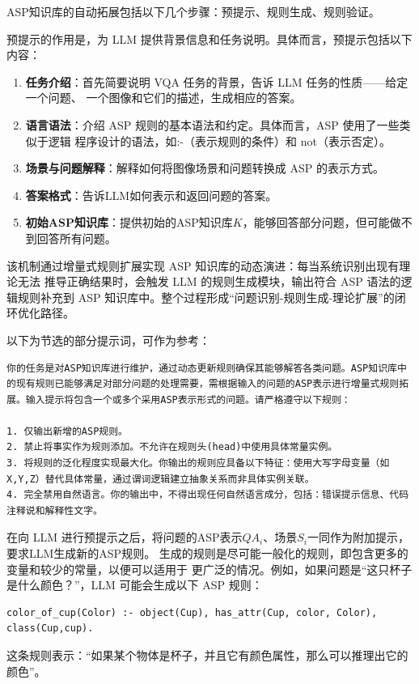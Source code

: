 ASP知识库的自动拓展包括以下几个步骤：预提示、规则生成、规则验证。

预提示的作用是，为 LLM 提供背景信息和任务说明。具体而言，预提示包括以下内容：
\begin{enumerate}[nosep]
\item \textbf{任务介绍}：首先简要说明 VQA 任务的背景，告诉 LLM 任务的性质——给定一个问题、
一个图像和它们的描述，生成相应的答案。
\item \textbf{语言语法}：介绍 ASP 规则的基本语法和约定。具体而言，ASP 使用了一些类似于逻辑
程序设计的语法，如:-（表示规则的条件）和 not（表示否定）。
\item \textbf{场景与问题解释}：解释如何将图像场景和问题转换成 ASP 的表示方式。
\item \textbf{答案格式}：告诉LLM如何表示和返回问题的答案。
\item \textbf{初始ASP知识库}：提供初始的ASP知识库$K$，能够回答部分问题，但可能做不到回答所有问题。
\end{enumerate}

该机制通过增量式规则扩展实现 ASP 知识库的动态演进：每当系统识别出现有理论无法
推导正确结果时，会触发 LLM 的规则生成模块，输出符合 ASP 语法的逻辑规则补充到 ASP
知识库中。整个过程形成“问题识别-规则生成-理论扩展”的闭环优化路径。

以下为节选的部分提示词，可作为参考：
\begin{lstlisting}
你的任务是对ASP知识库进行维护，通过动态更新规则确保其能够解答各类问题。ASP知识库中的现有规则已能够满足对部分问题的处理需要，需根据输入的问题的ASP表示进行增量式规则拓展。输入提示将包含一个或多个采用ASP表示形式的问题。请严格遵守以下规则：

1. 仅输出新增的ASP规则。
2. 禁止将事实作为规则添加。不允许在规则头(head)中使用具体常量实例。
3. 将规则的泛化程度实现最大化。你输出的规则应具备以下特征：使用大写字母变量（如X,Y,Z）替代具体常量，通过谓词逻辑建立抽象关系而非具体实例关联。
4. 完全禁用自然语言。你的输出中，不得出现任何自然语言成分，包括：错误提示信息、代码注释说和解释性文字。
\end{lstlisting}

在向 LLM 进行预提示之后，将问题的ASP表示$QA_i$、场景$S_i$一同作为附加提示，要求LLM生成新的ASP规则。
生成的规则是尽可能一般化的规则，即包含更多的变量和较少的常量，以便可以适用于
更广泛的情况。例如，如果问题是“这只杯子是什么颜色？”，LLM 可能会生成以下 ASP 规则：
\begin{lstlisting}
color_of_cup(Color) :- object(Cup), has_attr(Cup, color, Color), class(Cup,cup).
\end{lstlisting}
这条规则表示：“如果某个物体是杯子，并且它有颜色属性，那么可以推理出它的颜色”。

